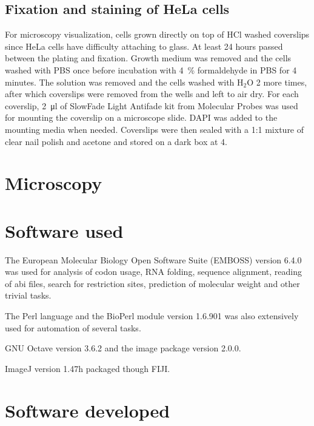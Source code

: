  \subsection{Fixation and staining of HeLa cells}
    For microscopy visualization, cells grown directly on top of HCl washed coverslips since
    HeLa cells have difficulty attaching to glass. At least 24 hours passed
    between the plating and fixation. Growth medium was removed and the cells
    washed with PBS once before incubation with \SI{4}{\percent} formaldehyde in PBS
    for 4 minutes. The solution was removed and the cells washed with H$_2$O 2 more
    times, after which coverslips were removed from the wells and left to air dry.
    For each coverslip, \SI{2}{\ul} of SlowFade Light Antifade kit from Molecular Probes
    was used for mounting the coverslip on a microscope slide. DAPI was added
    to the mounting media when needed. Coverslips were then sealed with a 1:1
    mixture of clear nail polish and acetone and stored on a dark box at \SI{4}{\dc}.


\section{Microscopy}
\section{Software used}
  The European Molecular Biology Open Software Suite (EMBOSS) version 6.4.0
  was used for analysis of codon usage, RNA folding, sequence alignment, reading of abi
  files, search for restriction sites, prediction of molecular weight and
  other trivial tasks.

  The Perl language and the BioPerl module version 1.6.901 was also extensively used for automation of
  several tasks.
  
  GNU Octave version 3.6.2 and the image package version 2.0.0.
  
  ImageJ version 1.47h packaged though FIJI.

\section{Software developed}




